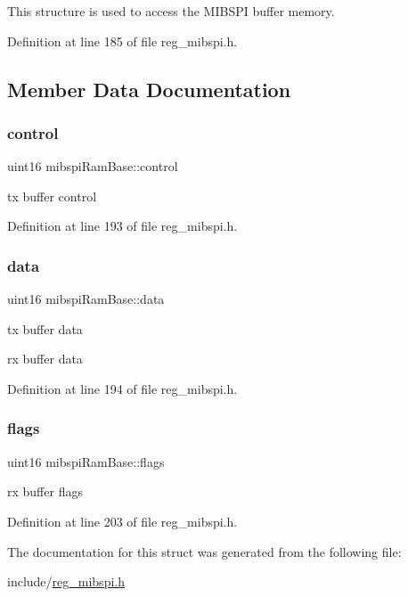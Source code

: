 This structure is used to access the M\+I\+B\+S\+PI buffer memory. 

Definition at line 185 of file reg\+\_\+mibspi.\+h.



\subsection{Member Data Documentation}
\mbox{\label{structmibspiRamBase_ac96ab60a96dcd73e510dde85eb28b90d}} 
\subsubsection{\texorpdfstring{control}{control}}
{\footnotesize\ttfamily uint16 mibspi\+Ram\+Base\+::control}

tx buffer control 

Definition at line 193 of file reg\+\_\+mibspi.\+h.

\mbox{\label{structmibspiRamBase_a1fe10494816123842ffb8fb7ba9cbc42}} 
\subsubsection{\texorpdfstring{data}{data}}
{\footnotesize\ttfamily uint16 mibspi\+Ram\+Base\+::data}

tx buffer data

rx buffer data 

Definition at line 194 of file reg\+\_\+mibspi.\+h.

\mbox{\label{structmibspiRamBase_a510d1c79ffd0312d12bfe0ba70fbfbdc}} 
\subsubsection{\texorpdfstring{flags}{flags}}
{\footnotesize\ttfamily uint16 mibspi\+Ram\+Base\+::flags}

rx buffer flags 

Definition at line 203 of file reg\+\_\+mibspi.\+h.



The documentation for this struct was generated from the following file\+:\begin{DoxyCompactItemize}
\item 
include/\mbox{\hyperlink{reg__mibspi_8h}{reg\+\_\+mibspi.\+h}}\end{DoxyCompactItemize}
